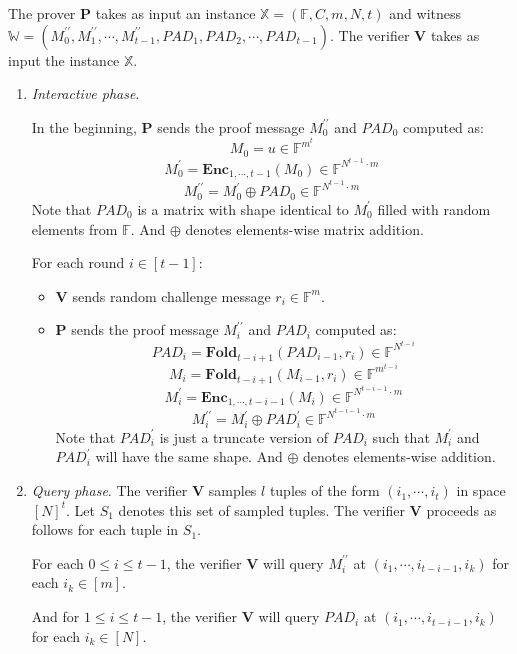The prover $\textbf{P}$ takes as input an instance $\mathbb{X} = (\mathbb{F}, C, m, N, t)$ and witness $\mathbb{W} = (M_0^{\prime\prime}, M_1^{\prime\prime}, \cdots, M_{t-1}^{\prime\prime}, PAD_1, PAD_2, \cdots, PAD_{t-1})$. The verifier $\textbf{V}$ takes as input the instance $\mathbb{X}$.

\begin{enumerate}
    \item \textit{Interactive phase}. 
    
    In the beginning, $\textbf{P}$ sends the proof message $M_0^{\prime\prime}$ and $PAD_0$ computed as:
$$
    M_0 = u \in \mathbb{F}^{m^t}
$$
$$
    M_0^{\prime} = \textbf{Enc}_{1,\cdots,t-1}(M_0) \in \mathbb{F}^{N^{t-1} \cdot m}
$$
$$
    M_0^{\prime\prime} = M_0^{\prime} \oplus PAD_0 \in \mathbb{F}^{N^{t-1} \cdot m}
$$
    Note that $PAD_0$ is a matrix with shape identical to $M_0^\prime$ filled with random elements from $\mathbb{F}$. And $\oplus$ denotes elements-wise matrix addition.
    
    For each round $i \in [t-1]$:
    \begin{itemize}
        \item $\textbf{V}$ sends random challenge message $r_i \in \mathbb{F}^m$.
        \item $\textbf{P}$ sends the proof message $M_i^{\prime\prime}$ and $PAD_i$ computed as:
$$
    PAD_i = \textbf{Fold}_{t-i+1}(PAD_{i-1}, r_i) \in \mathbb{F}^{N^{t-i}}
$$
$$
    M_i = \textbf{Fold}_{t-i+1}(M_{i-1}, r_i) \in \mathbb{F}^{m^{t-i}}
$$
$$
    M_i^\prime =  \textbf{Enc}_{1, \cdots, t- i - 1}(M_i) \in \mathbb{F}^{N^{t-i-1} \cdot m}
$$
$$
    M_i^{\prime\prime} = M_i^{\prime} \oplus PAD_i^\prime \in \mathbb{F}^{N^{t-i-1} \cdot m}
$$
    Note that $PAD_i^\prime$ is just a truncate version of $PAD_i$ such that $M_i^{\prime}$ and $ PAD_i^\prime$ will have the same shape. And $\oplus$ denotes elements-wise addition.

    \end{itemize}
    \item \textit{Query phase}. The verifier $\textbf{V}$ samples $l$ tuples of the form $(i_1, \cdots, i_t)$ in space $[N]^t$. Let $S_1$ denotes this set of sampled tuples.
    The verifier $\textbf{V}$ proceeds as follows for each tuple in $S_1$.
    
    For each $0 \le i \le t-1$, 
    the verifier $\textbf{V}$ will query $M_{i}^{\prime\prime}$ at $(i_1, \cdots, i_{t-i-1}, i_k)$ for each $i_k \in [m]$. 
    
    And for $1 \le i \le t-1$,
    the verifier $\textbf{V}$ will query $PAD_{i}$ at $(i_1, \cdots, i_{t-i-1}, i_k)$ for each $i_k \in [N]$.
    

\end{enumerate}
